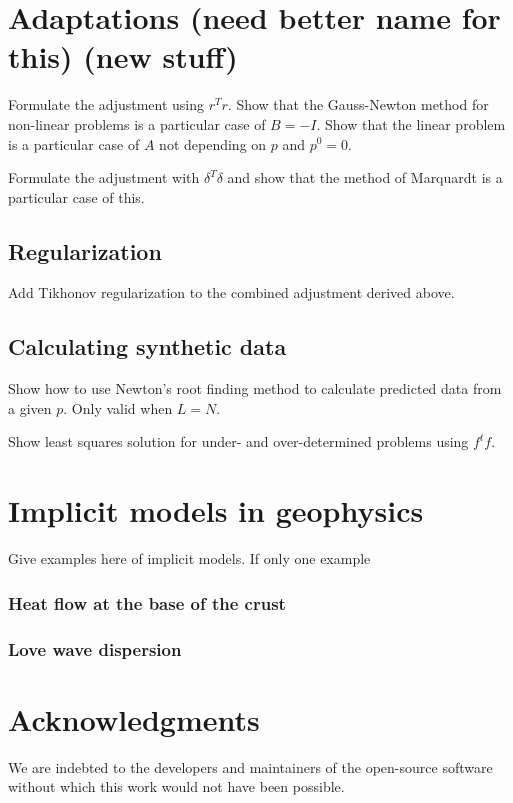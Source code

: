 \documentclass[onecolumn]{article}
\begin{document}
\section{Adaptations (need better name for this) (new stuff)}

Formulate the adjustment using $r^Tr$.
Show that the Gauss-Newton method
for non-linear problems
is a particular case of $B = -I$.
Show that the linear problem
is a particular case of $A$ not depending on $p$
and $p^0 = 0$.

Formulate the adjustment with $\delta^T\delta$
and show that the method of Marquardt
is a particular case of this.



\subsection{Regularization}

Add Tikhonov regularization to the combined adjustment derived above.



\subsection{Calculating synthetic data}

Show how to use Newton's root finding method to calculate predicted data from a
given $p$. Only valid when $L = N$.

Show least squares solution for under- and over-determined problems using
$f^tf$.

\section{Implicit models in geophysics}

Give examples here of implicit models.
If only one example


\subsubsection{Heat flow  at the base of the crust}

\subsubsection{Love wave dispersion}


\section{Acknowledgments}

We are indebted to the developers and maintainers of the open-source
software without which this work would not have been possible.




\end{document}
